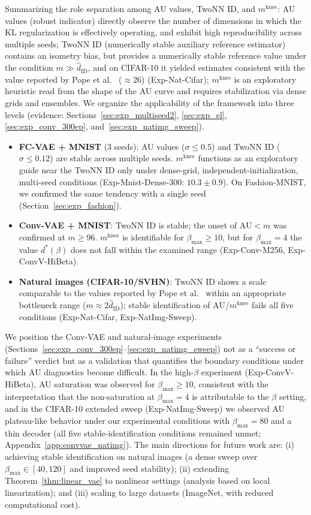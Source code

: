 \documentclass[make,article,submit,pdftex,moreauthors]{Definitions/mdpi}
\newcommand{\mknee}{m^{\mathrm{knee}}}
\begin{document}
Summarizing the role separation among AU values, TwoNN ID, and $\mknee$:
AU values (robust indicator) directly observe the number of dimensions in
which the KL regularization is effectively operating, and exhibit high
reproducibility across multiple seeds;
TwoNN ID (numerically stable auxiliary reference estimator) contains an
isometry bias, but provides a numerically stable reference value under the
condition $m \gg \hat{d}_\mathrm{ID}$, and on CIFAR-10 it yielded estimates
consistent with the value reported by Pope et al.~\cite{pope2021intrinsic}
($\approx 26$) (Exp-Nat-Cifar);
$\mknee$ is an exploratory heuristic read from the shape of the AU curve and
requires stabilization via dense grids and ensembles.
We organize the applicability of the framework into three levels
(evidence: Sections~\ref{sec:exp_multiseed2}, \ref{sec:exp_el},
\ref{sec:exp_conv_300ep}, and~\ref{sec:exp_natimg_sweep}).
\begin{itemize}
  \item \textbf{FC-VAE + MNIST} (3 seeds): AU values ($\sigma\leq0.5$) and
  TwoNN ID ($\sigma\leq0.12$) are stable across multiple seeds. $\mknee$
  functions as an exploratory guide near the TwoNN ID only under dense-grid,
  independent-initialization, multi-seed conditions
  (Exp-Mnist-Dense-300: $10.3\pm0.9$). On Fashion-MNIST, we confirmed the
  same tendency with a single seed (Section~\ref{sec:exp_fashion}).
  \item \textbf{Conv-VAE + MNIST}: TwoNN ID is stable; the onset of AU$<m$
  was confirmed at $m\geq96$. $\mknee$ is identifiable for
  $\beta_{\max}\geq10$, but for $\beta_{\max}=4$ the value $d^*(\beta)$ does
  not fall within the examined range (Exp-Conv-M256, Exp-ConvV-HiBeta).
  \item \textbf{Natural images (CIFAR-10/SVHN)}: TwoNN ID shows a scale
  comparable to the values reported by Pope et al.~\cite{pope2021intrinsic}
  within an appropriate bottleneck range ($m\approx2\hat{d}_\mathrm{ID}$);
  stable identification of AU/$\mknee$ fails all five conditions
  (Exp-Nat-Cifar, Exp-NatImg-Sweep).
\end{itemize}

We position the Conv-VAE and natural-image experiments
(Sections~\ref{sec:exp_conv_300ep}--\ref{sec:exp_natimg_sweep}) not as a
``success or failure'' verdict but as a validation that quantifies the
boundary conditions under which AU diagnostics become difficult.
In the high-$\beta$ experiment (Exp-ConvV-HiBeta), AU saturation was observed
for $\beta_{\max} \geq 10$, consistent with the interpretation that the
non-saturation at $\beta_{\max}=4$ is attributable to the $\beta$ setting,
and in the CIFAR-10 extended sweep (Exp-NatImg-Sweep) we observed AU
plateau-like behavior under our experimental conditions with
$\beta_{\max}=80$ and a thin decoder (all five stable-identification
conditions remained unmet; Appendix~\ref{app:convvae_natimg}).
The main directions for future work are:
(i) achieving stable identification on natural images (a dense sweep over
$\beta_{\max} \in [40,120]$ and improved seed stability);
(ii) extending Theorem~\ref{thm:linear_vae} to nonlinear settings (analysis
based on local linearization); and
(iii) scaling to large datasets (ImageNet, with reduced computational cost).
\end{document}

